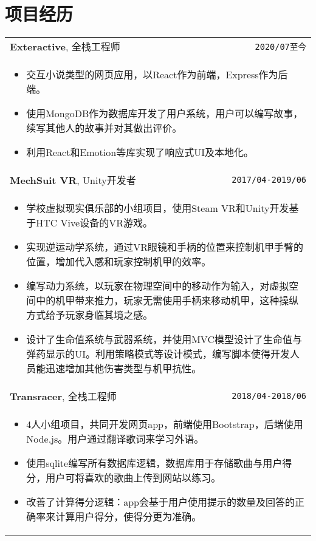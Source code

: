 \documentclass[UTF8]{ctexart}
\newcommand{\itemcols}[1]{
\multicolumn{2}{p{\dimexpr \linewidth-2\tabcolsep}}{
\begin{itemize}
#1
\end{itemize}
}
}
\begin{document}
\section{项目经历}
\smallskip
\noindent
\begin{tabularx}{\linewidth}{X r}
\textbf{\large Exteractive}, 全栈工程师 & \texttt{2020/07至今} \\
\itemcols{
\item 交互小说类型的网页应用，以React作为前端，Express作为后端。
\item 使用MongoDB作为数据库开发了用户系统，用户可以编写故事，续写其他人的故事并对其做出评价。
\item 利用React和Emotion等库实现了响应式UI及本地化。
} \\

\textbf{\large MechSuit VR}, Unity开发者 & \texttt{2017/04-2019/06} \\
\itemcols{
\item 学校虚拟现实俱乐部的小组项目，使用Steam VR和Unity开发基于HTC Vive设备的VR游戏。
\item 实现逆运动学系统，通过VR眼镜和手柄的位置来控制机甲手臂的位置，增加代入感和玩家控制机甲的效率。
\item 编写动力系统，以玩家在物理空间中的移动作为输入，对虚拟空间中的机甲带来推力，玩家无需使用手柄来移动机甲，这种操纵方式给予玩家身临其境之感。
\item 设计了生命值系统与武器系统，并使用MVC模型设计了生命值与弹药显示的UI。利用策略模式等设计模式，编写脚本使得开发人员能迅速增加其他伤害类型与机甲抗性。
} \\

\textbf{\large Transracer}, 全栈工程师 & \texttt{2018/04-2018/06} \\
\itemcols{
\item 4人小组项目，共同开发网页app，前端使用Bootstrap，后端使用Node.js。用户通过翻译歌词来学习外语。
\item 使用sqlite编写所有数据库逻辑，数据库用于存储歌曲与用户得分，用户可将喜欢的歌曲上传到网站以练习。
\item 改善了计算得分逻辑：app会基于用户使用提示的数量及回答的正确率来计算用户得分，使得分更为准确。
} \\

\end{tabularx}
\end{document}
